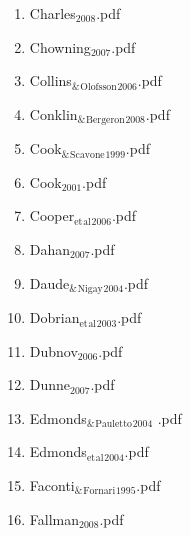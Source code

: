 \documentclass[11pt]{article}
\begin{document}
\begin{enumerate}
\begin{enumerate}
\item Charles$_{\text{2008}}$.pdf
\label{sec-1-1-1-1-11-19-17-32}

\item Chowning$_{\text{2007}}$.pdf
\label{sec-1-1-1-1-11-19-17-33}

\item Collins$_{\text{\&}}$$_{\text{Olofsson}}$$_{\text{2006}}$.pdf
\label{sec-1-1-1-1-11-19-17-34}

\item Conklin$_{\text{\&}}$$_{\text{Bergeron}}$$_{\text{2008}}$.pdf
\label{sec-1-1-1-1-11-19-17-35}

\item Cook$_{\text{\&}}$$_{\text{Scavone}}$$_{\text{1999}}$.pdf
\label{sec-1-1-1-1-11-19-17-36}

\item Cook$_{\text{2001}}$.pdf
\label{sec-1-1-1-1-11-19-17-37}

\item Cooper$_{\text{et}}$$_{\text{al}}$$_{\text{2006}}$.pdf
\label{sec-1-1-1-1-11-19-17-38}

\item Dahan$_{\text{2007}}$.pdf
\label{sec-1-1-1-1-11-19-17-39}

\item Daude$_{\text{\&}}$$_{\text{Nigay}}$$_{\text{2004}}$.pdf
\label{sec-1-1-1-1-11-19-17-40}

\item Dobrian$_{\text{et}}$$_{\text{al}}$$_{\text{2003}}$.pdf
\label{sec-1-1-1-1-11-19-17-41}

\item Dubnov$_{\text{2006}}$.pdf
\label{sec-1-1-1-1-11-19-17-42}

\item Dunne$_{\text{2007}}$.pdf
\label{sec-1-1-1-1-11-19-17-43}

\item Edmonds$_{\text{\&}}$$_{\text{Pauletto}}$$_{\text{2004}}$ .pdf
\label{sec-1-1-1-1-11-19-17-44}

\item Edmonds$_{\text{et}}$$_{\text{al}}$$_{\text{2004}}$.pdf
\label{sec-1-1-1-1-11-19-17-45}

\item Faconti$_{\text{\&}}$$_{\text{Fornari}}$$_{\text{1995}}$.pdf
\label{sec-1-1-1-1-11-19-17-46}

\item Fallman$_{\text{2008}}$.pdf
\label{sec-1-1-1-1-11-19-17-47}


\end{enumerate}
\end{enumerate}
\end{document}
